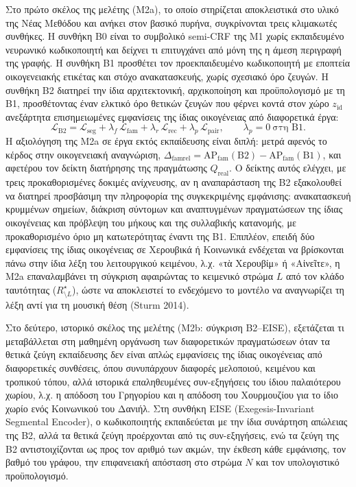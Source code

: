 \documentclass[11pt,a4paper]{article}
\newcommand{\Rs}{R^{\star}}
\begin{document}
Στο πρώτο σκέλος της μελέτης (Μ2a), το οποίο στηρίζεται αποκλειστικά στο υλικό της Νέας Μεθόδου και ανήκει στον βασικό πυρήνα, συγκρίνονται τρεις κλιμακωτές συνθήκες. Η συνθήκη B0 είναι το συμβολικό semi-CRF της Μ1 χωρίς εκπαιδευμένο νευρωνικό κωδικοποιητή και δείχνει τι επιτυγχάνει από μόνη της η άμεση περιγραφή της γραφής. Η συνθήκη B1 προσθέτει τον προεκπαιδευμένο κωδικοποιητή με εποπτεία οικογενειακής ετικέτας και στόχο ανακατασκευής, χωρίς σχεσιακό όρο ζευγών. Η συνθήκη B2 διατηρεί την ίδια αρχιτεκτονική, αρχικοποίηση και προϋπολογισμό με τη B1, προσθέτοντας έναν ελκτικό όρο θετικών ζευγών που φέρνει κοντά στον χώρο $z_{\text{id}}$ ανεξάρτητα επισημειωμένες εμφανίσεις της ίδιας οικογένειας από διαφορετικά έργα:
\[
\mathcal L_{\text{B2}}=\mathcal L_{\text{seg}}+\lambda_f\,\mathcal L_{\text{fam}}+\lambda_r\,\mathcal L_{\text{rec}}+\lambda_p\,\mathcal L_{\text{pair}},\qquad \lambda_p=0\ \text{στη B1}.
\]
Η αξιολόγηση της Μ2a σε έργα εκτός εκπαίδευσης είναι διπλή: μετρά αφενός το κέρδος στην οικογενειακή αναγνώριση, $\Delta_{\text{famrel}}=\mathrm{AP}_{\text{fam}}(\text{B2})-\mathrm{AP}_{\text{fam}}(\text{B1})$, και αφετέρου τον δείκτη διατήρησης της πραγμάτωσης $Q_{\text{real}}$. Ο δείκτης αυτός ελέγχει, με τρεις προκαθορισμένες δοκιμές ανίχνευσης, αν η αναπαράσταση της B2 εξακολουθεί να διατηρεί προσβάσιμη την πληροφορία της συγκεκριμένης εμφάνισης: ανακατασκευή κρυμμένων σημείων, διάκριση σύντομων και αναπτυγμένων πραγματώσεων της ίδιας οικογένειας και πρόβλεψη του μήκους και της συλλαβικής κατανομής, με προκαθορισμένο όριο μη κατωτερότητας έναντι της B1. Επιπλέον, επειδή δύο εμφανίσεις της ίδιας οικογένειας σε Χερουβικά ή Κοινωνικά ενδέχεται να βρίσκονται πάνω στην ίδια λέξη του λειτουργικού κειμένου, λ.χ. «τὰ Χερουβίμ» ή «Αἰνεῖτε», η Μ2a επαναλαμβάνει τη σύγκριση αφαιρώντας το κειμενικό στρώμα $L$ από τον κλάδο ταυτότητας ($\Rs_{\setminus L}$), ώστε να αποκλειστεί το ενδεχόμενο το μοντέλο να αναγνωρίζει τη λέξη αντί για τη μουσική θέση (Sturm 2014).

Στο δεύτερο, ιστορικό σκέλος της μελέτης (Μ2b: σύγκριση B2--EISE), εξετάζεται τι μεταβάλλεται στη μαθημένη οργάνωση των διαφορετικών πραγματώσεων όταν τα θετικά ζεύγη εκπαίδευσης δεν είναι απλώς εμφανίσεις της ίδιας οικογένειας από διαφορετικές συνθέσεις, όπου συνυπάρχουν διαφορές μελοποιού, κειμένου και τροπικού τόπου, αλλά ιστορικά επαληθευμένες συν-εξηγήσεις του ίδιου παλαιότερου χωρίου, λ.χ. η απόδοση του Γρηγορίου και η απόδοση του Χουρμουζίου για το ίδιο χωρίο ενός Κοινωνικού του Δανιήλ. Στη συνθήκη EISE (Exegesis-Invariant Segmental Encoder), ο κωδικοποιητής εκπαιδεύεται με την ίδια συνάρτηση απώλειας της B2, αλλά τα θετικά ζεύγη προέρχονται από τις συν-εξηγήσεις, ενώ τα ζεύγη της B2 αντιστοιχίζονται ως προς τον αριθμό των ακμών, την έκθεση κάθε εμφάνισης, τον βαθμό του γράφου, την επιφανειακή απόσταση στο στρώμα $N$ και τον υπολογιστικό προϋπολογισμό.
\end{document}

